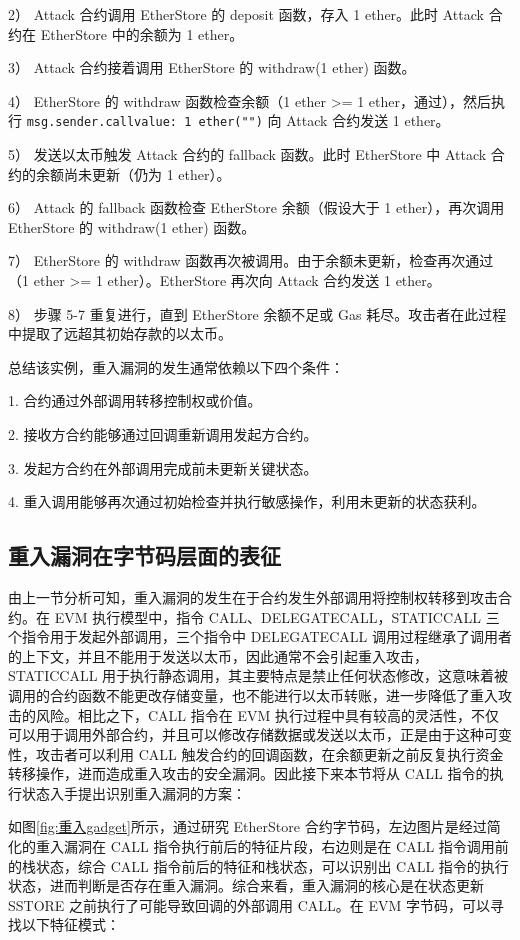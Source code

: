 \documentclass[print, master, vlined, timesmath]{DissertUESTC}
\begin{document}
2）  Attack 合约调用 EtherStore 的 deposit 函数，存入 1 ether。此时 Attack 合约在 EtherStore 中的余额为 1 ether。

3） Attack 合约接着调用 EtherStore 的 withdraw(1 ether) 函数。

4）  EtherStore 的 withdraw 函数检查余额（1 ether >= 1 ether，通过），然后执行 \texttt{msg.sender.call{value: 1 ether}("")}  向 Attack 合约发送 1 ether。

5） 发送以太币触发 Attack 合约的 fallback 函数。此时 EtherStore 中 Attack 合约的余额尚未更新（仍为 1 ether）。

6）  Attack 的 fallback 函数检查 EtherStore 余额（假设大于 1 ether），再次调用 EtherStore 的 withdraw(1 ether) 函数。

7） EtherStore 的 withdraw 函数再次被调用。由于余额未更新，检查再次通过（1 ether >= 1 ether）。EtherStore 再次向 Attack 合约发送 1 ether。

8）  步骤 5-7 重复进行，直到 EtherStore 余额不足或 Gas 耗尽。攻击者在此过程中提取了远超其初始存款的以太币。

总结该实例，重入漏洞的发生通常依赖以下四个条件：

1.  合约通过外部调用转移控制权或价值。

2.  接收方合约能够通过回调重新调用发起方合约。

3.  发起方合约在外部调用完成前未更新关键状态。

4.  重入调用能够再次通过初始检查并执行敏感操作，利用未更新的状态获利。

\subsection{重入漏洞在字节码层面的表征}

由上一节分析可知，重入漏洞的发生在于合约发生外部调用将控制权转移到攻击合约。在 EVM 执行模型中，指令 CALL、DELEGATECALL，STATICCALL 三个指令用于发起外部调用，三个指令中 DELEGATECALL 调用过程继承了调用者的上下文，并且不能用于发送以太币，因此通常不会引起重入攻击，STATICCALL 用于执行静态调用，其主要特点是禁止任何状态修改，这意味着被调用的合约函数不能更改存储变量，也不能进行以太币转账，进一步降低了重入攻击的风险。相比之下，CALL 指令在 EVM 执行过程中具有较高的灵活性，不仅可以用于调用外部合约，并且可以修改存储数据或发送以太币，正是由于这种可变性，攻击者可以利用 CALL 触发合约的回调函数，在余额更新之前反复执行资金转移操作，进而造成重入攻击的安全漏洞。因此接下来本节将从 CALL 指令的执行状态入手提出识别重入漏洞的方案：

如图\ref{fig:重入gadget}所示，通过研究 EtherStore 合约字节码，左边图片是经过简化的重入漏洞在 CALL 指令执行前后的特征片段，右边则是在 CALL 指令调用前的栈状态，综合 CALL 指令前后的特征和栈状态，可以识别出 CALL 指令的执行状态，进而判断是否存在重入漏洞。综合来看，重入漏洞的核心是在状态更新 SSTORE 之前执行了可能导致回调的外部调用 CALL。在 EVM 字节码，可以寻找以下特征模式：
\end{document}
